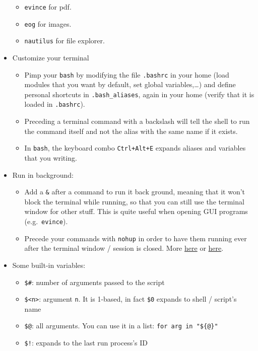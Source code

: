 \documentclass[a4paper,12pt,%
              final%
              ]{article}
\begin{document}
\begin{itemize}
\begin{itemize}
      \item \texttt{evince} for pdf.
      \item \texttt{eog} for images.
      \item \texttt{nautilus} for file explorer.
    \end{itemize}
  \item Customize your terminal
    \begin{itemize}
      \item Pimp your \texttt{bash} by modifying the file \texttt{.bashrc} in your home (load modules that you want by default, set global variables,\ldots) and define personal shortcuts in \texttt{.bash\_aliases}, again in your home (verify that it is loaded in \texttt{.bashrc}).
      \item Preceding a terminal command with a backslash will tell the shell to run the command itself and not the alias with the same name if it exists.
      \item In \texttt{bash}, the keyboard combo \texttt{Ctrl+Alt+E} expands aliases and variables that you writing.
    \end{itemize}
  \item Run in background:
    \begin{itemize}
      \item Add a \verb|&| after a command to run it back ground, meaning that it won't block the terminal while running, so that you can still use the terminal window for other stuff. This is quite useful when opening GUI programs (e.g.~\texttt{evince}).
      \item Precede your commands with \texttt{nohup} in order to have them running ever after the terminal window / session is closed. More \href{https://linux.101hacks.com/unix/nohup-command/}{here} or \href{https://hexadix.com/use-nohup-execute-commands-background-keep-running-exit-shell-promt/}{here}.
    \end{itemize}
  \item Some built-in variables:
    \begin{itemize}
      \item \verb|$#|: number of arguments passed to the script
      \item \verb|$<n>|: argument \texttt{n}. It is 1-based, in fact \verb|$0| expands to shell / script's name
      \item \verb|$@|: all arguments. You can use it in a list: \verb|for arg in "${@}"|
      \item \verb|$!|: expands to the last run process's ID

\end{itemize}
\end{itemize}
\end{document}
